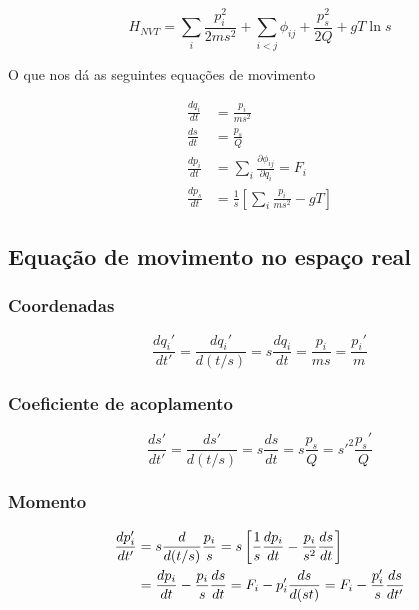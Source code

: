 \documentclass[twoside, a4paper]{scrartcl}
\newcommand{\phiij}{\phi_{ij}}
\newcommand{\del}[2]{\frac{\partial #1}{\partial #2}}
\newcommand{\deri}[2]{\frac{d #1}{d #2}}
\begin{document}
\begin{equation}
	H_{NVT} = \sum_i \frac{p_i^2}{2ms^2} + \sum_{i<j} \phiij + \frac{p_s^2}{2Q} + gT \ln s
\end{equation}

O que nos dá as seguintes equações de movimento

\begin{subequations}
	\begin{align}
		\deri{q_i}{t} &= \frac{p_i}{ms^2}\\
		\deri{s}{t} &= \frac{p_s}{Q}\\
		\deri{p_i}{t} &= \sum_i \del{\phiij}{q_i} = F_i \\
		\deri{p_s}{t} &= \frac{1}{s} \left[\sum_i \frac{p_i}{ms^2} - gT\right]
	\end{align}
\end{subequations}

\subsection{Equação de movimento no espaço real}

\subsubsection*{Coordenadas}

\begin{equation}
	\deri{q_i'}{t'} = \deri{q_i'}{(t/s)} = s \deri{q_i}{t} = \frac{p_i}{ms} = \frac{p_i'}{m}
\end{equation}

\subsubsection*{Coeficiente de acoplamento}

\begin{equation}
	\deri{s'}{t'} = \deri{s'}{(t/s)} = s \deri{s}{t} = s\frac{p_s}{Q}= s'^2\frac{p_s'}{Q}
\end{equation}

\subsubsection*{Momento}

\begin{align}
	\deri{p_i'}{t'} &= s \deri{}{(t/s)} \frac{p_i}{s} = s\left[\frac{1}{s}\deri{p_i}{t} - \frac{p_i}{s^2}\deri{s}{t}\right]\notag \\
			&= \deri{p_i}{t} - \frac{p_i}{s}\deri{s}{t} = F_i - p_i' \deri{s}{(st)} = F_i - \frac{p_i'}{s}\frac{ds}{dt'}
\end{align}
\end{document}

